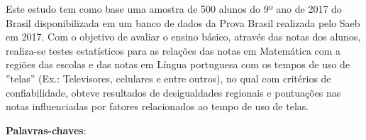 
\setlength{\absparsep}{18pt} %
\begin{resumo}  
    
    Este estudo tem como base uma amostra de 500 alunos do 9º ano de 2017 do Brasil disponibilizada em um banco de dados da Prova Brasil realizada pelo Saeb em 2017. Com o objetivo de avaliar o ensino básico, através das notas dos alunos, realiza-se testes estatísticos para as relações das notas em Matemática com a regiões das escolas e das notas em Língua portuguesa com os tempos de uso de ''telas'' (Ex.: Televisores, celulares e entre outros), no qual com critérios de confiabilidade, obteve resultados de desigualdades regionais e pontuações nas notas influenciadas por fatores relacionados ao tempo de uso de telas.

    
  \noindent
  \textbf{Palavras-chaves}: \kwords
\end{resumo}
